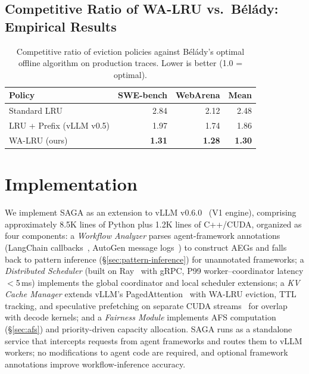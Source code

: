 \documentclass[sigconf]{acmart}
\newcommand{\sysname}{SAGA\xspace}
\begin{document}
\subsection{Competitive Ratio of WA-LRU vs.\ B\'{e}l\'{a}dy: Empirical Results}
\label{sec:competitive}

\begin{table}[t]
    \centering
    \caption{Competitive ratio of eviction policies against B\'{e}l\'{a}dy's optimal offline algorithm on production traces. Lower is better (1.0 = optimal).}
    \label{tab:competitive}
    \begin{tabular}{lrrr}
    \toprule
    \textbf{Policy} & \textbf{SWE-bench} & \textbf{WebArena} & \textbf{Mean} \\
    \midrule
    Standard LRU & 2.84 & 2.12 & 2.48 \\
    LRU + Prefix (vLLM v0.5) & 1.97 & 1.74 & 1.86 \\
    WA-LRU (ours) & \textbf{1.31} & \textbf{1.28} & \textbf{1.30} \\
    \bottomrule
    \end{tabular}
\end{table}

\section{Implementation}
\label{sec:impl}

We implement \sysname as an extension to vLLM v0.6.0~\cite{kwon2023vllm} (V1 engine), comprising approximately 8.5K lines of Python plus 1.2K lines of C++/CUDA, organized as four components: a \emph{Workflow Analyzer} parses agent-framework annotations (LangChain callbacks~\cite{langchain2024}, AutoGen message logs~\cite{wu2024autogen}) to construct AEGs and falls back to pattern inference (\S\ref{sec:pattern-inference}) for unannotated frameworks; a \emph{Distributed Scheduler} (built on Ray~\cite{moritz2018ray} with gRPC, P99 worker--coordinator latency $<$5\,ms) implements the global coordinator and local scheduler extensions; a \emph{KV Cache Manager} extends vLLM's PagedAttention~\cite{kwon2023vllm} with WA-LRU eviction, TTL tracking, and speculative prefetching on separate CUDA streams~\cite{Rennich12-CUDAStreams} for overlap with decode kernels; and a \emph{Fairness Module} implements AFS computation (\S\ref{sec:afs}) and priority-driven capacity allocation. \sysname runs as a standalone service that intercepts requests from agent frameworks and routes them to vLLM workers; no modifications to agent code are required, and optional framework annotations improve workflow-inference accuracy.
\end{document}
